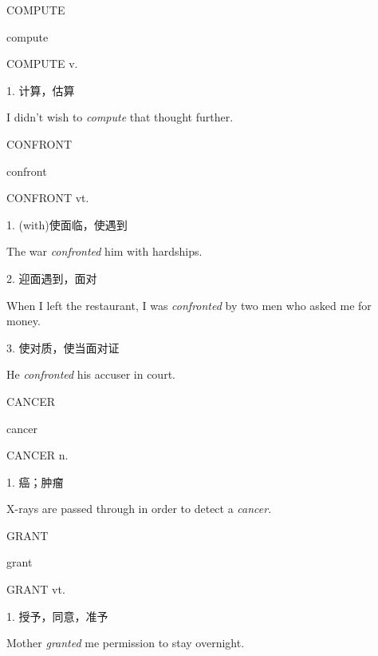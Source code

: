 \begin{flashcard}{
COMPUTE

compute
}
\begin{center}
COMPUTE v. 
\end{center}
1. 计算，估算

I didn't wish to \textit{compute} that thought further.

\end{flashcard}
\begin{flashcard}{
CONFRONT

confront
}
\begin{center}
CONFRONT vt. 
\end{center}
1. (with)使面临，使遇到

The war \textit{confronted} him with hardships.

2. 迎面遇到，面对

When I left the restaurant, I was \textit{confronted} by two men who asked me for money.

3. 使对质，使当面对证

He \textit{confronted} his accuser in court.

\end{flashcard}
\begin{flashcard}{
CANCER

cancer
}
\begin{center}
CANCER n. 
\end{center}
1. 癌；肿瘤

X-rays are passed through in order to detect a \textit{cancer}.

\end{flashcard}
\begin{flashcard}{
GRANT

grant
}
\begin{center}
GRANT vt. 
\end{center}
1. 授予，同意，准予

Mother \textit{granted} me permission to stay overnight.

\end{flashcard}
